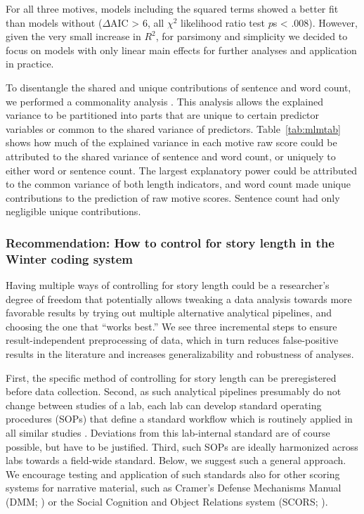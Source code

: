\documentclass[man,a4paper,mask]{apa6}\usepackage[]{graphicx}\usepackage[]{color}
\begin{document}
For all three motives, models including the squared terms showed a better fit than models without ($\Delta$AIC > 6, all $\chi^2$ likelihood ratio test $p$s < .008). However, given the very small increase in $R^2$, for parsimony and simplicity we decided to focus on models with only linear main effects for further analyses and application in practice.


To disentangle the shared and unique contributions of sentence and word count, we performed a commonality analysis \parencite{nimon_r_2008}. This analysis allows the explained variance to be partitioned into parts that are unique to certain predictor variables or common to the shared variance of predictors. Table~\ref{tab:mlmtab} shows how much of the explained variance in each motive raw score could be attributed to the shared variance of sentence and word count, or uniquely to either word or sentence count. The largest explanatory power could be attributed to the common variance of both length indicators, and word count made unique contributions to the prediction of raw motive scores. Sentence count had only negligible unique contributions.


\subsubsection{Recommendation: How to control for story length in the Winter coding system}
Having multiple ways of controlling for story length could be a researcher's degree of freedom \parencite{john_measuring_2012} that potentially allows tweaking a data analysis towards more favorable results by trying out multiple alternative analytical pipelines, and choosing the one that ``works best.'' We see three incremental steps to ensure result-independent preprocessing of data, which in turn reduces false-positive results in the literature and increases generalizability and robustness of analyses. 

First, the specific method of controlling for story length can be preregistered before data collection. Second, as such analytical pipelines presumably do not change between studies of a lab, each lab can develop standard operating procedures (SOPs) that define a standard workflow which is routinely applied in all similar studies \parencite{lin_StandardOperatingProcedures_2016}. Deviations from this lab-internal standard are of course possible, but have to be justified. Third, such SOPs are ideally harmonized across labs towards a field-wide standard. Below, we suggest such a general approach. We encourage testing and application of such standards also for other scoring systems for narrative material, such as Cramer’s Defense Mechanisms Manual (DMM; ) or the Social Cognition and Object Relations system (SCORS; ).
\end{document}
